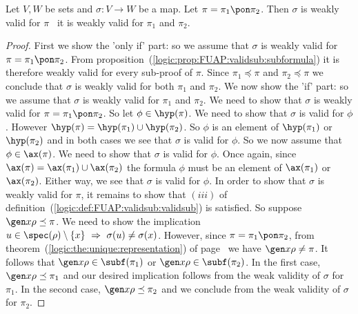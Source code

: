 \begin{prop}\label{logic:prop:FUAP:validsub:recursion:pon}
Let $V, W$ be sets and $\sigma:V\to W$ be a map. Let
$\pi=\pi_{1}\pon\pi_{2}$. Then $\sigma$ is weakly valid for $\pi$
\ifand\ it is weakly valid for $\pi_{1}$ and $\pi_{2}$.
\end{prop}
\begin{proof}
First we show the 'only if' part: so we assume that $\sigma$ is
weakly valid for $\pi=\pi_{1}\pon\pi_{2}$. From
proposition~(\ref{logic:prop:FUAP:validsub:subformula}) it is
therefore weakly valid for every sub-proof of $\pi$. Since
$\pi_{1}\preceq\pi$ and $\pi_{2}\preceq\pi$ we conclude that
$\sigma$ is weakly valid for both $\pi_{1}$ and $\pi_{2}$. We now
show the 'if' part: so we assume that $\sigma$ is weakly valid for
$\pi_{1}$ and $\pi_{2}$. We need to show that $\sigma$ is weakly
valid for $\pi=\pi_{1}\pon\pi_{2}$. So let $\phi\in\hyp(\pi)$. We
need to show that $\sigma$ is valid for $\phi$. However
$\hyp(\pi)=\hyp(\pi_{1})\cup\hyp(\pi_{2})$. So $\phi$ is an element
of $\hyp(\pi_{1})$ or $\hyp(\pi_{2})$ and in both cases we see that
$\sigma$ is valid for $\phi$. So we now assume that
$\phi\in\ax(\pi)$. We need to show that $\sigma$ is valid for
$\phi$. Once again, since $\ax(\pi)=\ax(\pi_{1})\cup\ax(\pi_{2})$
the formula $\phi$ must be an element of $\ax(\pi_{1})$ or
$\ax(\pi_{2})$. Either way, we see that $\sigma$ is valid for
$\phi$. In order to show that $\sigma$ is weakly valid for $\pi$, it
remains to show that $(iii)$ of
definition~(\ref{logic:def:FUAP:validsub:validsub}) is satisfied. So
suppose $\gen x\rho\preceq\pi$. We need to show the implication
$u\in\spec(\rho)\setminus\{x\}\ \Rightarrow\
\sigma(u)\neq\sigma(x)$. However, since $\pi=\pi_{1}\pon\pi_{2}$,
from theorem~(\ref{logic:the:unique:representation}) of
page~\pageref{logic:the:unique:representation} we have $\gen
x\rho\neq\pi$. It follows that $\gen x\rho\in\subf(\pi_{1})$ or
$\gen x\rho\in\subf(\pi_{2})$. In the first case, $\gen
x\rho\preceq\pi_{1}$ and our desired implication follows from the
weak validity of $\sigma$ for $\pi_{1}$. In the second case, $\gen
x\rho\preceq\pi_{2}$  and we conclude from the weak validity of
$\sigma$ for $\pi_{2}$.
\end{proof}

